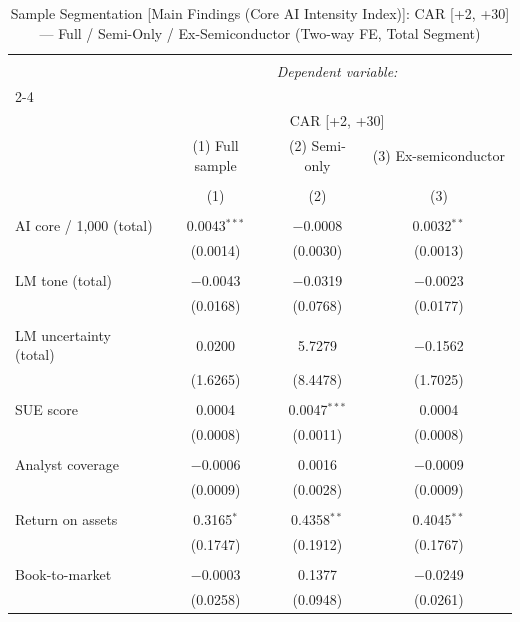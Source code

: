 
\begin{table}[!htbp] \centering 
  \caption{Sample Segmentation [Main Findings (Core AI Intensity Index)]: CAR [+2, +30] — Full / Semi-Only / Ex-Semiconductor (Two-way FE, Total Segment)} 
  \label{} 
\begin{tabular}{@{\extracolsep{5pt}}lccc} 
\\[-1.8ex]\hline 
\hline \\[-1.8ex] 
 & \multicolumn{3}{c}{\textit{Dependent variable:}} \\ 
\cline{2-4} 
\\[-1.8ex] & \multicolumn{3}{c}{CAR [+2, +30]} \\ 
 & (1) Full sample & (2) Semi-only & (3) Ex-semiconductor \\ 
\\[-1.8ex] & (1) & (2) & (3)\\ 
\hline \\[-1.8ex] 
 AI core / 1,000 (total) & 0.0043$^{***}$ & $-$0.0008 & 0.0032$^{**}$ \\ 
  & (0.0014) & (0.0030) & (0.0013) \\ 
  & & & \\ 
 LM tone (total) & $-$0.0043 & $-$0.0319 & $-$0.0023 \\ 
  & (0.0168) & (0.0768) & (0.0177) \\ 
  & & & \\ 
 LM uncertainty (total) & 0.0200 & 5.7279 & $-$0.1562 \\ 
  & (1.6265) & (8.4478) & (1.7025) \\ 
  & & & \\ 
 SUE score & 0.0004 & 0.0047$^{***}$ & 0.0004 \\ 
  & (0.0008) & (0.0011) & (0.0008) \\ 
  & & & \\ 
 Analyst coverage & $-$0.0006 & 0.0016 & $-$0.0009 \\ 
  & (0.0009) & (0.0028) & (0.0009) \\ 
  & & & \\ 
 Return on assets & 0.3165$^{*}$ & 0.4358$^{**}$ & 0.4045$^{**}$ \\ 
  & (0.1747) & (0.1912) & (0.1767) \\ 
  & & & \\ 
 Book-to-market & $-$0.0003 & 0.1377 & $-$0.0249 \\ 
  & (0.0258) & (0.0948) & (0.0261) \\ 

\end{tabular}
\end{table}

